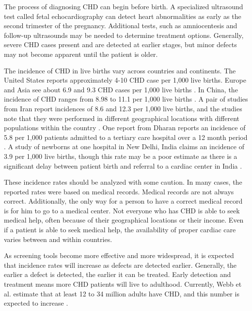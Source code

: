 The process of diagnosing CHD can begin before birth. A specialized ultrasound test called fetal echocardiography can detect heart abnormalities as early as the second trimester of the pregnancy. Additional tests, such as amniocentesis and follow-up ultrasounds may be needed to determine treatment options. Generally, severe CHD cases present and are detected at earlier stages, but minor defects may not become apparent until the patient is older. 

The incidence of CHD in live births vary across countries and continents. The United States reports approximately 4-10 CHD case per 1,000 live births. Europe and Asia see about 6.9 and 9.3 CHD cases per 1,000 live births \cite{Mozaffarian2016}. 
In China, the incidence of CHD ranges from 8.98 to 11.1 per 1,000 live births \cite{Zhao2019} \cite{Qu2016}. 
A pair of studies from Iran report incidences of 8.6 and 12.3 per 1,000 live births, and the studies note that they were performed in different geographical locations with different populations within the country \cite{Nikyar2011} \cite{Rahim2008}.
One report from Dharan reports an incidence of 5.8 per 1,000 patients admitted to a tertiary care hospital over a 12 month period \cite{Shah2008}. A study of newborns at one hospital in New Delhi, India claims an incidence of 3.9 per 1,000 live births, though this rate may be a poor estimate as there is a significant delay between patient birth and referral to a cardiac center in India \cite{Khalil1994} \cite{Saxena2005}.

These incidence rates should be analyzed with some caution. In many cases, the reported rates were based on medical records. Medical records are not always correct. Additionally, the only way for a person to have a correct medical record is for him to go to a medical center. Not everyone who has CHD is able to seek medical help, often because of their geographical locations or their income. Even if a patient is able to seek medical help, the availability of proper cardiac care varies between and within countries. 

As screening tools become more effective and more widespread, it is expected that incidence rates will increase as defects are detected earlier. Generally, the earlier a defect is detected, the earlier it can be treated. Early detection and treatment means more CHD patients will live to adulthood. Currently, Webb et al. estimate that at least 12 to 34 million adults have CHD, and this number is expected to increase \cite{Webb2015}.

